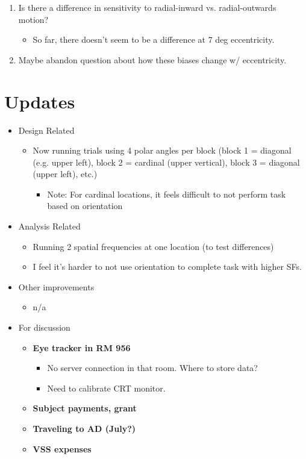 \documentclass[11pt]{article} %
\begin{document}
\begin{enumerate}
\begin{figure}[H]
	\end{figure}
	\item Is there a difference in sensitivity to radial-inward vs. radial-outwards motion? 
	\begin{itemize}
	\item{So far, there doesn't seem to be a difference at 7 deg eccentricity.}
	\end{itemize}
	\item Maybe abandon question about how these biases change w/ eccentricity.
\end{enumerate}


\newpage
\section{Updates} 
\begin{itemize}
\item Design Related
	\begin{itemize}
	\item Now running trials using 4 polar angles per block (block 1 = diagonal (e.g. upper left), block 2 = cardinal (upper vertical), block 3 = diagonal (upper left), etc.)
		\begin{itemize}
			\item{Note: For cardinal locations, it feels difficult to not perform task based on orientation}
		\end{itemize}
	\end{itemize}
\item Analysis Related
	\begin{itemize}
	\item Running 2 spatial frequencies at one location (to test differences)
	\item I feel it's harder to not use orientation to complete task with higher SFs.
	\end{itemize}
\item Other improvements
	\begin{itemize}
	\item n/a
	\end{itemize}
\item For discussion
	\begin{itemize}
	\item \textbf{Eye tracker in RM 956}
		\begin{itemize}
			\item{No server connection in that room. Where to store data?}
			\item{Need to calibrate CRT monitor.}
		\end{itemize}
	\item \textbf{Subject payments, grant}
	\item \textbf{Traveling to AD (July?)}
	\item \textbf{VSS expenses}
	\end{itemize}
\end{itemize}
\end{document}
